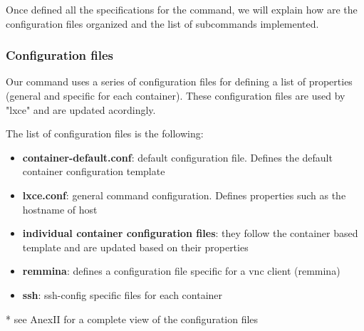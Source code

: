 Once defined all the specifications for the command, we will explain how are the configuration files organized and the list of subcommands implemented.


\subsubsection{Configuration files}
Our command uses a series of configuration files for defining a list of properties (general and specific for each container). These configuration files are used by "lxce" and are updated acordingly.

The list of configuration files is the following:
\begin{itemize}
	\item{\textbf{container-default.conf}: default configuration file. Defines the default container configuration template}
	\item{\textbf{lxce.conf}: general command configuration. Defines properties such as the hostname of host}
	\item{\textbf{individual container configuration files}: they follow the container based template and are updated based on their properties}
	\item{\textbf{remmina}: defines a configuration file specific for a vnc client (remmina) }
	\item{\textbf{ssh}: ssh-config specific files for each container }
\end{itemize}

* see AnexII for a complete view of the configuration files

